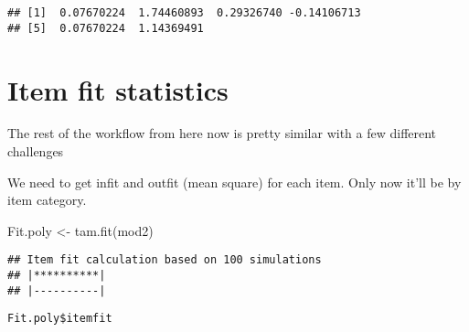 \documentclass[
]{book}
\newenvironment{Shaded}{\begin{snugshade}}{\end{snugshade}}
\newcommand{\FunctionTok}[1]{\textcolor[rgb]{0.00,0.00,0.00}{#1}}
\newcommand{\NormalTok}[1]{#1}
\newcommand{\OtherTok}[1]{\textcolor[rgb]{0.56,0.35,0.01}{#1}}
\newcommand{\SpecialCharTok}[1]{\textcolor[rgb]{0.00,0.00,0.00}{#1}}
\begin{document}
\begin{Shaded}
\end{Shaded}

\begin{verbatim}
## [1]  0.07670224  1.74460893  0.29326740 -0.14106713
## [5]  0.07670224  1.14369491
\end{verbatim}

\hypertarget{item-fit-statistics}{%
\section{Item fit statistics}\label{item-fit-statistics}}

The rest of the workflow from here now is pretty similar with a few different challenges

We need to get infit and outfit (mean square) for each item. Only now it'll be by item category.

\begin{Shaded}
\begin{Highlighting}[]
\NormalTok{Fit.poly }\OtherTok{\textless{}{-}} \FunctionTok{tam.fit}\NormalTok{(mod2)}
\end{Highlighting}
\end{Shaded}

\begin{verbatim}
## Item fit calculation based on 100 simulations
## |**********|
## |----------|
\end{verbatim}

\begin{verbatim}
Fit.poly$itemfit
\end{verbatim}

\begin{Shaded}
\end{Shaded}
\end{document}
